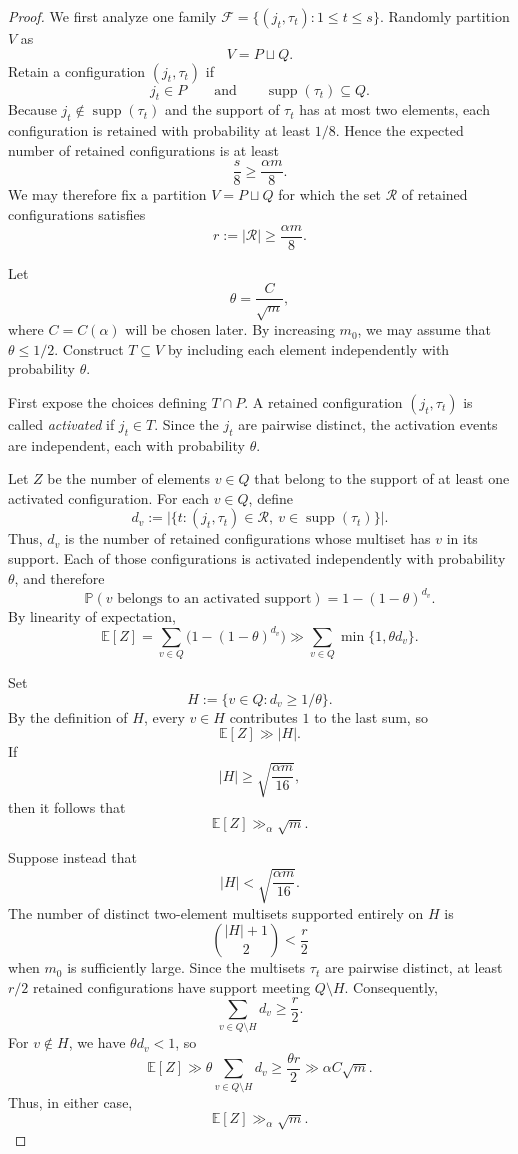 \documentclass[10pt]{article}
\theoremstyle{definition}
\begin{document}
\begin{proof}
We first analyze one family
$\mathcal F=\{(j_t,\tau_t):1\le t\le s\}$.  Randomly partition $V$ as
\[
    V=P\sqcup Q.
\]
Retain a configuration $(j_t,\tau_t)$ if
\[
    j_t\in P
    \qquad\text{and}\qquad
    \operatorname{supp}(\tau_t)\subseteq Q.
\]
Because $j_t\notin\operatorname{supp}(\tau_t)$ and the support of $\tau_t$
has at most two elements, each configuration is retained with probability
at least $1/8$.  Hence the expected number of retained configurations is at
least
\[
    \frac{s}{8}\ge\frac{\alpha m}{8}.
\]
We may therefore fix a partition $V=P\sqcup Q$ for which the set
$\mathcal R$ of retained configurations satisfies
\[
    r:=|\mathcal R|\ge\frac{\alpha m}{8}.
\]

Let
\[
    \theta=\frac{C}{\sqrt m},
\]
where $C=C(\alpha)$ will be chosen later.  By increasing $m_0$, we may
assume that $\theta\le 1/2$.  Construct $T\subseteq V$ by including each
element independently with probability $\theta$.

First expose the choices defining $T\cap P$.  A retained configuration
$(j_t,\tau_t)$ is called \emph{activated} if $j_t\in T$.  Since the $j_t$
are pairwise distinct, the activation events are independent, each with
probability $\theta$.

Let $Z$ be the number of elements $v\in Q$ that belong to the support of at
least one activated configuration.  For each $v\in Q$, define
\[
    d_v:=
    \bigl|\{t:(j_t,\tau_t)\in\mathcal R,
                    \ v\in\operatorname{supp}(\tau_t)\}\bigr|.
\]
Thus, $d_v$ is the number of retained configurations whose multiset has
$v$ in its support.  Each of those configurations is activated
independently with probability $\theta$, and therefore
\[
    \mathbb P(v\text{ belongs to an activated support})
       =1-(1-\theta)^{d_v}.
\]
By linearity of expectation,
\[
    \mathbb E[Z]
      =\sum_{v\in Q}\bigl(1-(1-\theta)^{d_v}\bigr)
      \gg \sum_{v\in Q}\min\{1,\theta d_v\}.
\]

Set
\[
    H:=\{v\in Q:d_v\ge 1/\theta\}.
\]
By the definition of $H$, every $v\in H$ contributes $1$ to the last sum,
so
\[
    \mathbb E[Z]\gg |H|.
\]
If
\[
    |H|\ge\sqrt{\frac{\alpha m}{16}},
\]
then it follows that
\[
    \mathbb E[Z]\gg_\alpha\sqrt m.
\]

Suppose instead that
\[
    |H|<\sqrt{\frac{\alpha m}{16}}.
\]
The number of distinct two-element multisets supported entirely on $H$ is
\[
    \binom{|H|+1}{2}<\frac r2
\]
when $m_0$ is sufficiently large.  Since the multisets $\tau_t$ are
pairwise distinct, at least $r/2$ retained configurations have support
meeting $Q\setminus H$.  Consequently,
\[
    \sum_{v\in Q\setminus H}d_v\ge\frac r2.
\]
For $v\notin H$, we have $\theta d_v<1$, so
\[
    \mathbb E[Z]
      \gg \theta\sum_{v\in Q\setminus H}d_v
      \ge \frac{\theta r}{2}
      \gg \alpha C\sqrt m.
\]
Thus, in either case,
\[
    \mathbb E[Z]\gg_\alpha\sqrt m.
\]


\end{proof}
\end{document}
